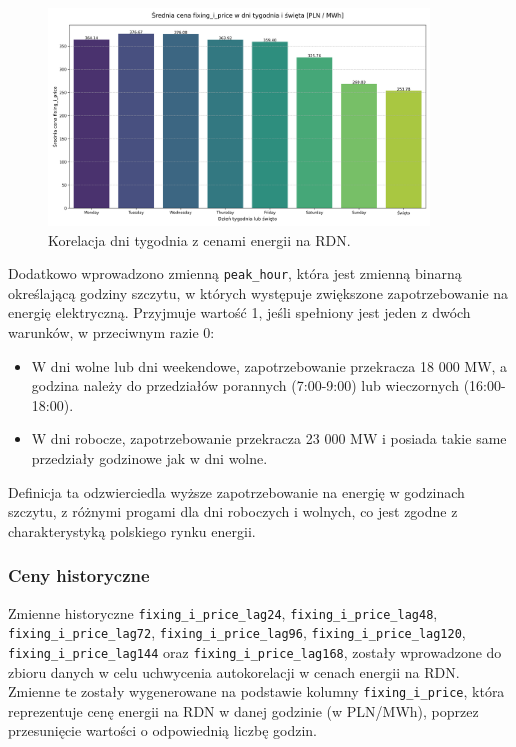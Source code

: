 \begin{figure}[H]
    \centering
    \includegraphics[width=0.9\textwidth]{../plots/fixing_i_price_weekdays_holidays.png}
    \caption{Korelacja dni tygodnia z cenami energii na RDN.}
    \label{fig:seasonal-correlation}
\end{figure}

Dodatkowo wprowadzono zmienną \texttt{peak\_hour}, która jest zmienną binarną określającą godziny szczytu, w których występuje zwiększone zapotrzebowanie na energię elektryczną. Przyjmuje wartość 1, jeśli spełniony jest jeden z dwóch warunków, w przeciwnym razie 0:
\begin{itemize}
    \item W dni wolne lub dni weekendowe, zapotrzebowanie przekracza 18 000 MW, a godzina należy do przedziałów porannych (7:00-9:00) lub wieczornych (16:00-18:00).
    \item W dni robocze, zapotrzebowanie przekracza 23 000 MW i posiada takie same przedziały godzinowe jak w dni wolne.
\end{itemize}
Definicja ta odzwierciedla wyższe zapotrzebowanie na energię w godzinach szczytu, z różnymi progami dla dni roboczych i wolnych, co jest zgodne z charakterystyką polskiego rynku energii.

\subsubsection{Ceny historyczne}
\label{subsec:historical_prices}
 
Zmienne historyczne \texttt{fixing\_i\_price\_lag24}, \texttt{fixing\_i\_price\_lag48}, \texttt{fixing\_i\_price\_lag72}, \texttt{fixing\_i\_price\_lag96}, \texttt{fixing\_i\_price\_lag120}, \texttt{fixing\_i\_price\_lag144} oraz \newline \texttt{fixing\_i\_price\_lag168}, zostały wprowadzone do zbioru danych w celu uchwycenia autokorelacji w cenach energii na RDN. Zmienne te zostały wygenerowane na podstawie kolumny \texttt{fixing\_i\_price}, która reprezentuje cenę energii na RDN w danej godzinie (w PLN/MWh), poprzez przesunięcie wartości o odpowiednią liczbę godzin. 

